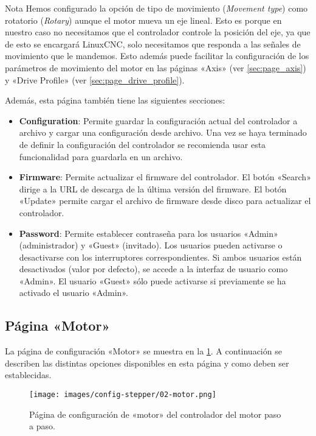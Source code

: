 \documentclass[english,spanish,a4paper,11pt]{article}
\begin{document}
\begin{admonition}{Nota}
    Hemos configurado la opción de tipo de movimiento (\textit{Movement type}) como rotatorio (\textit{Rotary}) aunque el motor mueva un eje lineal. Esto es porque en nuestro caso no necesitamos que el controlador controle la posición del eje, ya que de esto se encargará LinuxCNC, solo necesitamos que responda a las señales de movimiento que le mandemos. Esto además puede facilitar la configuración de los parámetros de movimiento del motor en las páginas «Axis» (ver \cref{sec:page_axis}) y «Drive Profile» (ver \cref{sec:page_drive_profile}).
\end{admonition}

Además, esta página también tiene las siguientes secciones:

\begin{itemize}
    \item \textbf{Configuration}: Permite guardar la configuración actual del controlador a archivo y cargar una configuración desde archivo. Una vez se haya terminado de definir la configuración del controlador se recomienda usar esta funcionalidad para guardarla en un archivo. 
    
    \item \textbf{Firmware}: Permite actualizar el firmware del controlador. El botón «Search» dirige a la URL de descarga de la última versión del firmware. El botón «Update» permite cargar el archivo de firmware desde disco para actualizar el controlador.
    
    \item \textbf{Password}: Permite establecer contraseña para los usuarios «Admin» (administrador) y «Guest» (invitado). Los usuarios pueden activarse o desactivarse con los interruptores correspondientes. Si ambos usuarios están desactivados (valor por defecto), se accede a la interfaz de usuario como «Admin». El usuario «Guest» sólo puede activarse si previamente se ha activado el usuario «Admin».
\end{itemize}


\subsection{Página «Motor»}

La página de configuración «Motor» se muestra en la \cref{fig:conf_stepper_2}. A continuación se describen las distintas opciones disponibles en esta página y como deben ser establecidas.


\begin{figure}[!ht]
    \centering
    \texttt{[image: images/config-stepper/02-motor.png]}
    \caption{Página de configuración de «motor» del controlador del motor paso a paso.}
    \label{fig:conf_stepper_2}
\end{figure}
\end{document}
